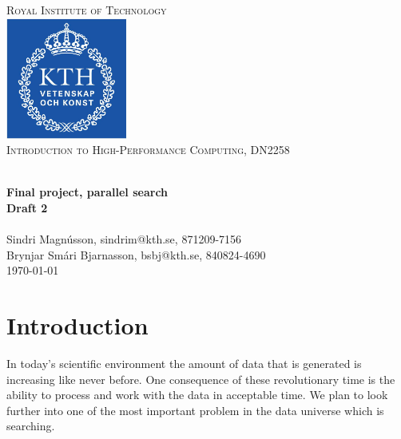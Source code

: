 \documentclass[a4paper,10pt]{article}
\title{}
\author{}
\begin{document}
\begin{titlepage}
\begin{center}


\textsc{\LARGE Royal Institute of Technology}\\[1.5cm]

\includegraphics[width=0.3\textwidth]{kth_mathematics_rgb.jpg}\\[1cm]

\textsc{\Large Introduction to High-Performance Computing, DN2258 }  %

\hrulefill \\[0.4cm]
{ \huge \bfseries Final project, parallel search\\ Draft 2}\\[0.4cm]
\hrulefill \\[1.5cm]


Sindri Magnússon, sindrim@kth.se, 871209-7156 \\
Brynjar Smári Bjarnasson, bsbj@kth.se, 840824-4690 \\


\vfill
{\large \today}

\end{center}
\end{titlepage}


\cleardoublepage
\tableofcontents
\newpage

\section{Introduction}

In today's scientific environment the amount of data that is generated is increasing like never before.  
One consequence of these revolutionary time is the ability to process and work with the data in acceptable time.  
We plan to look further into one of the most important problem in the data universe which is searching.  
\end{document}
